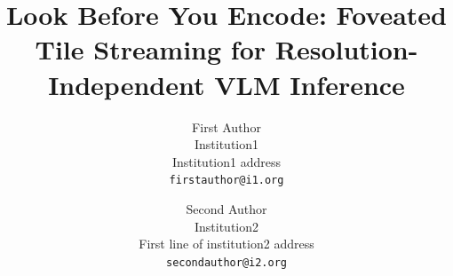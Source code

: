 \documentclass[10pt,twocolumn,letterpaper]{article}
\title{Look Before You Encode: Foveated Tile Streaming for Resolution-Independent VLM Inference}
\author{First Author\\
Institution1\\
Institution1 address\\
{\tt\small firstauthor@i1.org}
\and
Second Author\\
Institution2\\
First line of institution2 address\\
{\tt\small secondauthor@i2.org}
}
\begin{document}
\maketitle







{
    \small
    
    
}

\clearpage
\setcounter{page}{1}
\renewcommand{\thepage}{S\arabic{page}}
\setcounter{section}{0}
\setcounter{table}{0}
\renewcommand{\thesection}{S\arabic{section}}
\renewcommand{\thetable}{S\arabic{table}}
\renewcommand{\theHsection}{S\arabic{section}}
\renewcommand{\theHtable}{S\arabic{table}}
\makeatletter\setlength{\@dblfptop}{0pt}\makeatother
\maketitlesupplementary







\end{document}
